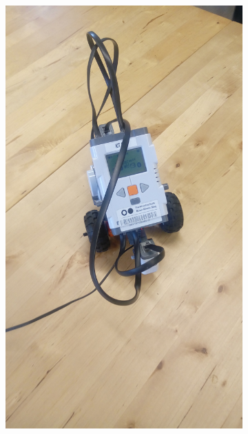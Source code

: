\documentclass[10pt]{scrartcl}
\begin{document}
\begin{figure}[h!]
\centering
\caption{LEGO Nxt Robot}
\label{fig:1}
  \begin{subfigure}[b]{0.4\textwidth}
    \includegraphics[width=\textwidth]{images/robot_1}
  \end{subfigure}
  \begin{subfigure}[b]{0.4\textwidth}

\end{subfigure}
\end{figure}
\end{document}
